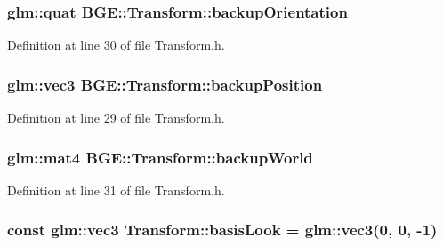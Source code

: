 \hypertarget{class_b_g_e_1_1_transform_ac1305552e0635ed07cf3e43ad898f038}{
\subsubsection[{backup\-Orientation}]{\setlength{\rightskip}{0pt plus 5cm}glm\-::quat B\-G\-E\-::\-Transform\-::backup\-Orientation}}\label{class_b_g_e_1_1_transform_ac1305552e0635ed07cf3e43ad898f038}


Definition at line 30 of file Transform.\-h.

\hypertarget{class_b_g_e_1_1_transform_add53307b7b17e3f2003d23b0cd859408}{
\subsubsection[{backup\-Position}]{\setlength{\rightskip}{0pt plus 5cm}glm\-::vec3 B\-G\-E\-::\-Transform\-::backup\-Position}}\label{class_b_g_e_1_1_transform_add53307b7b17e3f2003d23b0cd859408}


Definition at line 29 of file Transform.\-h.

\hypertarget{class_b_g_e_1_1_transform_a9eb76804ec98e5f22a3512a7c0393a8e}{
\subsubsection[{backup\-World}]{\setlength{\rightskip}{0pt plus 5cm}glm\-::mat4 B\-G\-E\-::\-Transform\-::backup\-World}}\label{class_b_g_e_1_1_transform_a9eb76804ec98e5f22a3512a7c0393a8e}


Definition at line 31 of file Transform.\-h.

\hypertarget{class_b_g_e_1_1_transform_a00e3d00aedfea161e5c1354e5fe80a54}{
\subsubsection[{basis\-Look}]{\setlength{\rightskip}{0pt plus 5cm}const glm\-::vec3 Transform\-::basis\-Look = glm\-::vec3(0, 0, -\/1)\hspace{0.3cm}{\ttfamily [static]}}}\label{class_b_g_e_1_1_transform_a00e3d00aedfea161e5c1354e5fe80a54}



